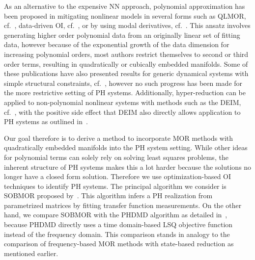 As an alternative to the expensive \ac{NN} approach, polynomial approximation has been proposed in mitigating nonlinear models in several forms such as QLMOR, cf.~\cite{Gu2011}, data-driven \ac{OI}, cf.~\cite{Peherstorfer2016, Kramer2019, BGK2020, Qian2022, Geelen2023, Sharma2023}, or by using modal derivatives, cf.~\cite{Jain2017, Rutzmoser2017}.
This ansatz involves generating higher order polynomial data from an originally linear set of fitting data, however because of the exponential growth of the data dimension for increasing polynomial orders, most authors restrict themselves to second or third order terms, resulting in quadratically or cubically embedded manifolds.
Some of these publications have also presented results for generic dynamical systems with simple structural constraints, cf.~\cite{BGH2020, Qian2020, Gosea2021, Khodabakhshi2022}, however no such progress has been made for the more restrictive setting of \ac{PH} systems.
Additionally, hyper-reduction can be applied to non-polynomial nonlinear systems with methods such as the \ac{DEIM}, cf.~\cite{Chaturantabut2010}, with the positive side effect that \ac{DEIM} also directly allows application to \ac{PH} systems as outlined in~\cite{Chaturantabut2016}.

Our goal therefore is to derive a method to incorporate \ac{MOR} methods with quadratically embedded manifolds into the \ac{PH} system setting.
While other ideas for polynomial terms can solely rely on solving least squares problems, the inherent structure of \ac{PH} systems makes this a lot harder because the solutions no longer have a closed form solution.
Therefore we use optimization-based \ac{OI} techniques to identify \ac{PH} systems.
The principal algorithm we consider is \ac{SOBMOR} proposed by~\cite{SV2023}.
This algorithm infers a \ac{PH} realization from parametrized matrices by fitting transfer function measurements.
On the other hand, we compare \ac{SOBMOR} with the \ac{PHDMD} algorithm as detailed in~\cite{Morandin2023}, because \ac{PHDMD} directly uses a time domain-based \ac{LSQ} objective function instead of the frequency domain.
This comparison stands in analogy to the comparison of frequency-based \ac{MOR} methods with state-based reduction as mentioned earlier.

